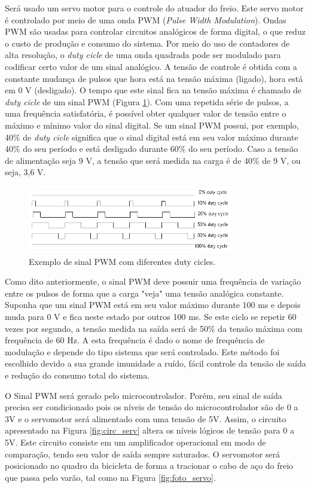 Será usado um servo motor para o controle do atuador do freio. Este servo motor é controlado por meio de uma onda PWM (\textit{Pulse Width Modulation}). Ondas PWM são usadas para controlar circuitos analógicos de forma digital, o que reduz o custo de produção e consumo do sistema. Por meio do uso de contadores de alta resolução, o \textit{duty cicle} de uma onda quadrada pode ser modulado para codificar certo valor de um sinal analógico. A tensão de controle é obtida com a constante mudança de pulsos que hora está na tensão máxima (ligado), hora está em 0 V (desligado). O tempo que este sinal fica na tensão máxima é chamado de \textit{duty cicle} de um sinal PWM (Figura \ref{fig:pwmcircuito}). Com uma repetida série de pulsos, a uma frequência satisfatória, é possível obter qualquer valor de tensão entre o máximo e mínimo valor do sinal digital.
Se um sinal PWM possui, por exemplo, 40\% de \textit{duty cicle} significa que o sinal digital está em seu valor máximo durante 40\% do seu período e está desligado durante 60\% do seu período. Caso a tensão de alimentação seja 9 V, a tensão que será medida na carga é de 40\% de 9 V, ou seja, 3,6 V.
\begin{figure}[h]
  \centering
	\includegraphics[width=0.8\textwidth]{figuras/pwmExample.png}
  \caption{Exemplo de sinal PWM com diferentes duty cicles.}
  \label{fig:pwmcircuito}
\end{figure}


Como dito anteriormente, o sinal PWM deve possuir uma frequência de variação entre os pulsos de forma que a carga "veja" uma tensão analógica constante. Suponha que um sinal PWM está em seu valor máximo durante 100 ms e depois muda para 0 V e fica neste estado por outros 100 ms. Se este ciclo se repetir 60 vezes por segundo, a tensão medida na saída será de 50\% da tensão máxima com frequência de 60 Hz. A esta frequência é dado o nome de frequência de modulação e depende do tipo sistema que será controlado.
Este método foi escolhido devido a sua grande imunidade a ruído, fácil controle da tensão de saída e redução do consumo total do sistema.

O Sinal PWM será gerado pelo microcontrolador. Porém, seu sinal de saída precisa ser condicionado pois os níveis de tensão do microcontrolador são de 0 a 3V e o servomotor será alimentado com uma tensão de 5V. Assim, o circuito apresentado na Figura \ref{fig:circ_serv} altera os níveis lógicos de tensão para 0 a 5V. Este circuito consiste em um amplificador operacional em modo de comparação, tendo seu valor de saída sempre saturados. O servomotor será posicionado no quadro da bicicleta de forma a tracionar o cabo de aço do freio que passa pelo varão, tal como na Figura \ref{fig:foto_servo}.

